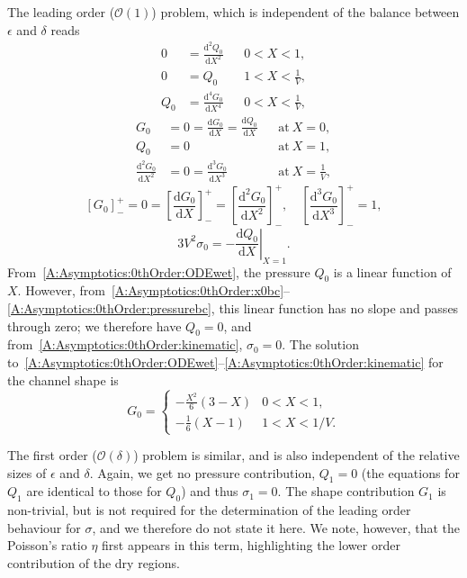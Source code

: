 \documentclass{jfm}
\newcommand{\dd}[2]{\frac{\mathrm{d} #1}{\mathrm{d} #2}}
\newcommand{\order}[1]{\mathcal{O}\left(#1\right)}
\newcommand{\poisson}{\eta} %
\begin{document}
The leading order ($\order{1}$) problem, which is independent of the balance between $\epsilon$ and $\delta$ reads
\begin{align}
0&= \dd{^2Q_0}{X^2} & &0 < X<1,\label{A:Asymptotics:0thOrder:ODEwet}\\
0&= Q_0  & &1 < X< \frac{1}{V},\\
Q_0 &= \dd{^4 G_0}{X^4} & & 0 < X < \frac{1}{V},
\end{align}
\begin{align}
G_0 &= 0 = \dd{G_0}{X}= \dd{Q_0}{X} & &\text{at}~X = 0,\label{A:Asymptotics:0thOrder:x0bc}\\
Q_0 &=0 & &\text{at}~X = 1,\label{A:Asymptotics:0thOrder:pressurebc}\\
\dd{^2 G_0}{X^2} &=0 = \dd{^3 G_0}{X^3} & &\text{at}~X = \frac{1}{V},
\end{align}
\begin{equation}
\left[G_0\right]_-^+ =0 = \left[\dd{G_0}{X}\right]_-^+ = \left[\dd{^2 G_0}{X^2}\right]_-^+, \quad  \left[\dd{^3 G_0}{X^3}\right]_-^+ = 1,
\end{equation}
\begin{equation}\label{A:Asymptotics:0thOrder:kinematic}
3V^2 \sigma_0 = -\left.\dd{Q_0}{X}\right|_{X=1}.
\end{equation}
From~\eqref{A:Asymptotics:0thOrder:ODEwet},  the pressure $Q_0$ is a linear function of $X$. However, from~\eqref{A:Asymptotics:0thOrder:x0bc}--\eqref{A:Asymptotics:0thOrder:pressurebc}, this linear function has no slope and passes through zero; we therefore have $Q_0 = 0$, and from~\eqref{A:Asymptotics:0thOrder:kinematic}, $\sigma_0 = 0$. The solution to~\eqref{A:Asymptotics:0thOrder:ODEwet}--\eqref{A:Asymptotics:0thOrder:kinematic} for the channel shape is
\begin{equation}\label{A:Asymptotics:0thOrder:solution}
G_0 = \begin{cases}
-\frac{X^2}{6}\left(3-X\right) & 0 < X < 1,\\
-\frac{1}{6}\left(X-1\right) & 1< X < 1/V.
\end{cases}
\end{equation}

The first order ($\order{\delta}$) problem is similar, and is also independent of the relative sizes of $\epsilon$ and $\delta$. Again, we get no pressure contribution, $Q_1 = 0$ (the equations for $Q_1$ are identical to those for $Q_0$) and thus $\sigma_1 = 0$. The shape contribution $G_1$ is non-trivial, but is not required for the determination of the leading order behaviour for $\sigma$, and we therefore do not state it here. We note, however, that the Poisson's ratio $\poisson$ first appears in this term, highlighting the lower order contribution of the dry regions.
\end{document}
